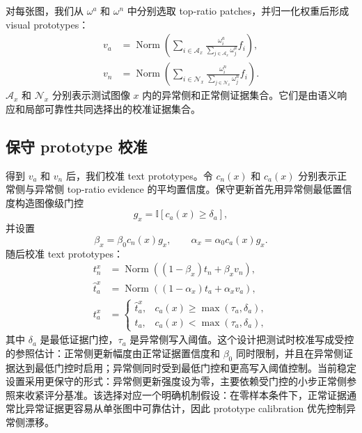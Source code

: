 对每张图，我们从 $\omega^a$ 和 $\omega^n$ 中分别选取 top-ratio patches，并归一化权重后形成 visual prototypes：
\begin{align}
  v_a &= \operatorname{Norm}\left(\sum_{i\in\mathcal{A}_x}
      \frac{\omega_i^a}{\sum_{j\in\mathcal{A}_x}\omega_j^a} f_i\right),\\
  v_n &= \operatorname{Norm}\left(\sum_{i\in\mathcal{N}_x}
      \frac{\omega_i^n}{\sum_{j\in\mathcal{N}_x}\omega_j^n} f_i\right).
  \label{eq:visual-prototypes}
\end{align}
$\mathcal{A}_x$ 和 $\mathcal{N}_x$ 分别表示测试图像 $x$ 内的异常侧和正常侧证据集合。它们是由语义响应和局部可靠性共同选择出的校准证据集合。

\subsection{保守 prototype 校准}

得到 $v_a$ 和 $v_n$ 后，我们校准 text prototypes。令 $c_n(x)$ 和 $c_a(x)$ 分别表示正常侧与异常侧 top-ratio evidence 的平均置信度。保守更新首先用异常侧最低置信度构造图像级门控
\begin{equation}
  g_x=\mathbb{I}[c_a(x)\ge \delta_a],
\end{equation}
并设置
\begin{equation}
  \beta_x=\beta_0 c_n(x)g_x,\qquad
  \alpha_x=\alpha_0 c_a(x)g_x .
\end{equation}
随后校准 text prototypes：
\begin{align}
  t_n^{x} &= \operatorname{Norm}\left((1-\beta_x)t_n+\beta_x v_n\right),\\
  \hat t_a^{x} &= \operatorname{Norm}\left((1-\alpha_x)t_a+\alpha_x v_a\right),\\
  t_a^{x} &=
  \begin{cases}
    \hat t_a^{x}, & c_a(x)\ge \max(\tau_a,\delta_a),\\
    t_a, & c_a(x)<\max(\tau_a,\delta_a),
  \end{cases}
\end{align}
其中 $\delta_a$ 是最低证据门控，$\tau_a$ 是异常侧写入阈值。这个设计把测试时校准写成受控的参照估计：正常侧更新幅度由正常证据置信度和 $\beta_0$ 同时限制，并且在异常侧证据达到最低门控时启用；异常侧同时受到最低门控和更高写入阈值控制。当前稳定设置采用更保守的形式：异常侧更新强度设为零，主要依赖受门控的小步正常侧参照来收紧评分基准。该选择对应一个明确机制假设：在零样本条件下，正常证据通常比异常证据更容易从单张图中可靠估计，因此 prototype calibration 优先控制异常侧漂移。

